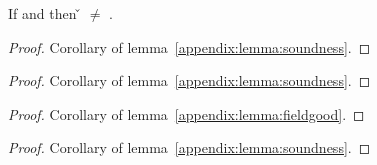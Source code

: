 {}

{}

\begin{theorem} \label{appendix:theorem:nullpointer}
If \judgement{\propenv{}}{\hastype{\v{}}{\t{}}}{\filterset{\thenprop{\prop{}}}{\elseprop{\prop{}}}}{\object{}}
and \notsubtypein{}{\Nil{}}{\t{}}
then {\v{}} $\not=$ \nil{}.
\begin{proof}
  Corollary of lemma~\ref{appendix:lemma:soundness}.
\end{proof}

\end{theorem}

\begin{lemma} \label{appendix:lemma:fieldgood}

\begin{proof}
  Corollary of lemma~\ref{appendix:lemma:soundness}.
\end{proof}

\end{lemma}

\begin{theorem} \label{appendix:theorem:fieldnil}

\begin{proof}
  Corollary of lemma~\ref{appendix:lemma:fieldgood}.
\end{proof}

\end{theorem}

\begin{theorem} \label{appendix:theorem:methodnil}

\begin{proof}
  Corollary of lemma~\ref{appendix:lemma:soundness}.
\end{proof}

\end{theorem}

{}

